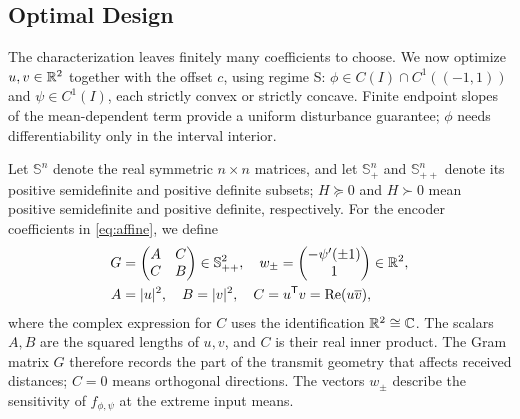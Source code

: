 \subsection{Optimal Design}\label{sec:synthesis}
The characterization leaves finitely many coefficients to choose. We now optimize $u,v\in\mathbb R^2$ together with the offset $c$, using regime S: $\phi\in C(I)\cap C^1((-1,1))$ and $\psi\in C^1(I)$, each strictly convex or strictly concave. Finite endpoint slopes of the mean-dependent term provide a uniform disturbance guarantee; $\phi$ needs differentiability only in the interval interior.

Let $\mathbb S^n$ denote the real symmetric $n\times n$ matrices, and let $\mathbb S^n_+$ and $\mathbb S^n_{++}$ denote its positive semidefinite and positive definite subsets; $H\succeq0$ and $H\succ0$ mean positive semidefinite and positive definite, respectively. For the encoder coefficients in \eqref{eq:affine}, we define
\begin{align*}
 G&=\begin{pmatrix}A&C\\ C&B\end{pmatrix}\in\mathbb S^2_{++},\quad
 w_\pm=\begin{pmatrix}-\psi'(\pm1)\\1\end{pmatrix}\in\mathbb R^2,\\
 A&=|u|^2,\quad B=|v|^2,\quad C=u^\mathsf T v=\operatorname{Re}(u\overline v),
\end{align*}
where the complex expression for $C$ uses the identification $\mathbb R^2\cong\mathbb C$. The scalars $A,B$ are the squared lengths of $u,v$, and $C$ is their real inner product. The Gram matrix $G$ therefore records the part of the transmit geometry that affects received distances; $C=0$ means orthogonal directions. The vectors $w_\pm$ describe the sensitivity of $f_{\phi,\psi}$ at the extreme input means.

